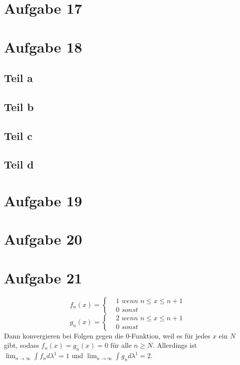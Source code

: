 \documentclass[10pt,a4paper]{article}
\begin{document}
\section{Aufgabe 17}

\section{Aufgabe 18}

\subsection{Teil a}

\subsection{Teil b}

\subsection{Teil c}

\subsection{Teil d}

\section{Aufgabe 19}

\section{Aufgabe 20}

\section{Aufgabe 21}
\begin{equation}
  f_{n}(x) = 
  \begin{cases}
    & 1\textit{ wenn $n \le x \le n + 1$}\\
    & 0\textit{ sonst}
  \end{cases}
\end{equation}
\begin{equation}
  g_{n}(x) = 
  \begin{cases}
    & 2\textit{ wenn $n \le x \le n + 1$}\\
    & 0\textit{ sonst}
  \end{cases}
\end{equation}
Dann konvergieren bei Folgen gegen die $0$-Funktion, weil es für jedes $x$ ein $N$ gibt, sodass $f_{n}(x) = g_{n}(x) = 0$ für alle $n \ge N$.
Allerdings ist $\lim_{n \rightarrow \infty} \int f_{n} d \lambda^{1} = 1$ und $\lim_{n \rightarrow \infty} \int g_{n} d \lambda^{1} = 2$.
\end{document}
